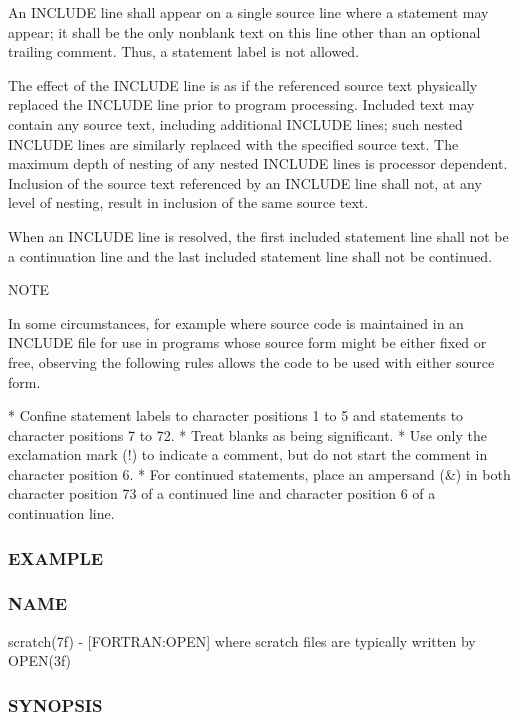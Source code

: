 An I\+N\+C\+L\+U\+DE line shall appear on a single source line where a statement may appear; it shall be the only nonblank text on this line other than an optional trailing comment. Thus, a statement label is not allowed.

The effect of the I\+N\+C\+L\+U\+DE line is as if the referenced source text physically replaced the I\+N\+C\+L\+U\+DE line prior to program processing. Included text may contain any source text, including additional I\+N\+C\+L\+U\+DE lines; such nested I\+N\+C\+L\+U\+DE lines are similarly replaced with the specified source text. The maximum depth of nesting of any nested I\+N\+C\+L\+U\+DE lines is processor dependent. Inclusion of the source text referenced by an I\+N\+C\+L\+U\+DE line shall not, at any level of nesting, result in inclusion of the same source text.

When an I\+N\+C\+L\+U\+DE line is resolved, the first included statement line shall not be a continuation line and the last included statement line shall not be continued.

N\+O\+TE \begin{DoxyVerb}    In some circumstances, for example where source code is
    maintained in an INCLUDE file for use in programs whose source
    form might be either fixed or free, observing the following
    rules allows the code to be used with either source form.

    *   Confine statement labels to character positions 1 to
        5 and statements to character positions 7 to 72.
    *   Treat blanks as being significant.
    *   Use only the exclamation mark (!) to indicate
        a comment, but do not start the comment in character
        position 6.
    *   For continued statements, place an ampersand (&) in
        both character position 73 of a continued line and character
        position 6 of a continuation line.
\end{DoxyVerb}
 \subsubsection*{E\+X\+A\+M\+P\+LE}

\subsubsection*{N\+A\+ME}

scratch(7f) -\/ \mbox{[}F\+O\+R\+T\+R\+AN\+:O\+P\+EN\mbox{]} where scratch files are typically written by O\+P\+E\+N(3f) \subsubsection*{S\+Y\+N\+O\+P\+S\+IS}

